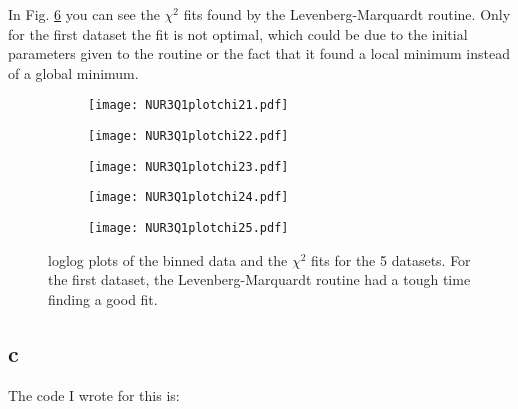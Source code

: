 In Fig. \ref{fig:fig2} you can see the $\chi^2$ fits found by the Levenberg-Marquardt routine. Only for the first dataset the fit is not optimal, which could be due to the initial parameters given to the routine or the fact that it found a local minimum instead of a global minimum. 

\begin{figure}[ht]
    \begin{subfigure}{.49\textwidth}
       \centering
    \texttt{[image: NUR3Q1plotchi21.pdf]}
    \centering
    \subcaption{}
    \label{}
    \end{subfigure}
    \hfill
    \begin{subfigure}{.49\textwidth}
       \centering
    \texttt{[image: NUR3Q1plotchi22.pdf]}
    \centering
    \subcaption{}
    \label{}
    \end{subfigure}
     \begin{subfigure}{.49\textwidth}
       \centering
    \texttt{[image: NUR3Q1plotchi23.pdf]}
    \centering
    \subcaption{}
    \label{}
    \end{subfigure}
     \begin{subfigure}{.49\textwidth}
       \centering
    \texttt{[image: NUR3Q1plotchi24.pdf]}
    \centering
    \subcaption{}
    \label{}
    \end{subfigure}
     \begin{subfigure}{.49\textwidth}
       \centering
    \texttt{[image: NUR3Q1plotchi25.pdf]}
    \centering
    \subcaption{}
    \label{}
    \end{subfigure}
    \caption{loglog plots of the binned data and the $\chi^2$ fits for the 5 datasets. For the first dataset, the Levenberg-Marquardt routine had a tough time finding a good fit.}
    \label{fig:fig2}
\end{figure}


\subsection*{c}

The code I wrote for this is:


